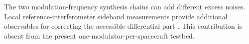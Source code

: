The two modulation-frequency synthesis chains can add different excess noises. Local reference-interferometer sideband measurements provide additional observables for correcting the accessible differential part \cite{hartwig_clock-jitter_2021}. This contribution is absent from the present one-modulator-per-spacecraft testbed.
